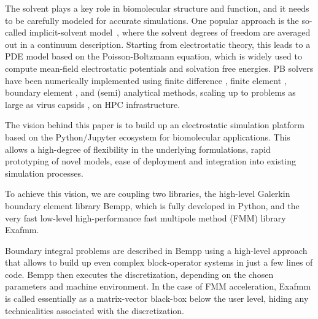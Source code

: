 The solvent plays a key role in biomolecular structure and function, and it needs to be carefully modeled for accurate simulations. 
One popular approach is the so-called implicit-solvent model~\cite{RouxSimonson1999,DecherchiETal2015}, where the solvent degrees of freedom are averaged out in a continuum description.
Starting from electrostatic theory, this leads to a PDE model based on the Poisson-Boltzmann equation, which is widely used to compute mean-field electrostatic potentials and solvation free energies.
PB solvers have been numerically implemented using finite difference \cite{RocchiaAlexovHonig2001, BakerETal2001}, finite element \cite{BakerETal2001,BondETal2010,HolstETal2012}, boundary element \cite{AltmanBardhanWhiteTidor2009, GengKrasny2013, ZhangPengHuangPitsianisSunLu2015, CooperBardhanBarba2014}, and (semi) analytical \cite{LotanHead-Gordon2006,FelbergETal2017} methods, scaling up to problems as large as virus capsids \cite{ZhangETal2019,MartinezETal2019}, on HPC infrastructure.

The vision behind this paper is to build up an electrostatic simulation platform based on the Python/Jupyter ecosystem for biomolecular applications. This allows a high-degree of flexibility in the underlying formulations, rapid prototyping of novel models, ease of deployment and integration into existing simulation processes.

To achieve this vision, we are coupling two libraries, the high-level Galerkin boundary element library Bempp, which is fully developed in Python, and the very fast low-level high-performance fast multipole method (FMM) library Exafmm. 

Boundary integral problems are described in Bempp using a high-level approach that allows to build up even complex block-operator systems in just a few lines of code. Bempp then executes the discretization, depending on the chosen parameters and machine environment. In the case of FMM acceleration, Exafmm is called essentially as a matrix-vector black-box below the user level, hiding any technicalities associated with the discretization.

